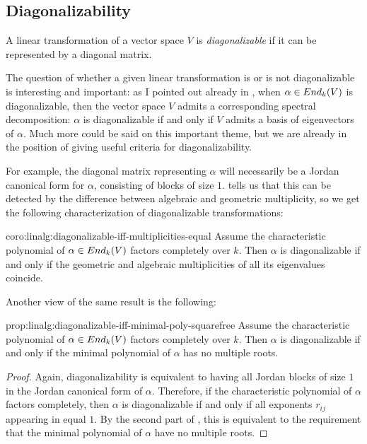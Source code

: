 \subsection{Diagonalizability}
\label{subsec:linalg:diagonalizability}
A linear transformation of a vector space $V$ is \emph{diagonalizable}
if it can be represented by a diagonal matrix.

The question of whether a given linear transformation is or is not
diagonalizable is interesting and important: as I pointed out already
in , when
$\alpha \in End_k(V)$ is diagonalizable, then the vector space $V$
admits a corresponding spectral decomposition: $\alpha$ is
diagonalizable if and only if $V$ admits a basis of eigenvectors of
$\alpha$. Much more could be said on this important theme, but we are
already in the position of giving useful criteria for
diagonalizability.

For example, the diagonal matrix representing $\alpha$ will
necessarily be a Jordan canonical form for $\alpha$, consisting of
blocks of size $1$.  tells us that this
can be detected by the difference between algebraic and geometric
multiplicity, so we get the following characterization of
diagonalizable transformations:

\begin{coro}{}{coro:linalg:diagonalizable-iff-multiplicities-equal}
  Assume the characteristic polynomial of $\alpha \in
  End_k(V)$ factors completely over $k$. Then $\alpha$ is
  diagonalizable if and only if the geometric and algebraic
  multiplicities of all its eigenvalues coincide.
\end{coro}

Another view of the same result is the following:

\begin{prop}{}{prop:linalg:diagonalizable-iff-minimal-poly-squarefree}
  Assume the characteristic polynomial of $\alpha \in
  End_k(V)$ factors completely over $k$. Then $\alpha$ is
  diagonalizable if and only if the minimal polynomial of $\alpha$ has
  no multiple roots.
\end{prop}

\begin{proof}
  Again, diagonalizability is equivalent to having all Jordan blocks
  of size $1$ in the Jordan canonical form of $\alpha$. Therefore, if
  the characteristic polynomial of $\alpha$ factors completely, then
  $\alpha$ is diagonalizable if and only if all exponents $r_{ij}$
  appearing in  equal $1$. By the second part
  of , this is equivalent to the requirement
  that the minimal polynomial of $\alpha$ have no multiple roots.
\end{proof}

